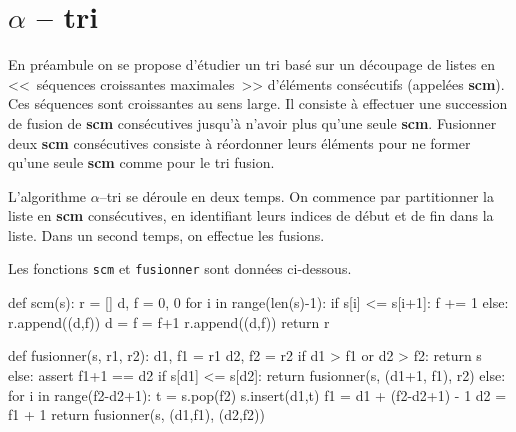 \documentclass[10pt,fleqn]{article} %
\begin{document}

\vspace{2cm}
\pagestyle{fancy}
\thispagestyle{plain}

\section*{$\alpha$ -- tri}
En préambule on se propose d'étudier un tri basé sur un découpage de listes en <<~séquences croissantes maximales~>> d'éléments consécutifs (appelées \textbf{scm}). Ces séquences sont croissantes au sens large.  Il consiste à effectuer une succession de fusion de \textbf{scm} consécutives jusqu'à n'avoir plus qu'une seule \textbf{scm}. Fusionner deux \textbf{scm} consécutives consiste à réordonner leurs éléments pour ne former qu'une seule \textbf{scm} comme pour le tri fusion. 

L'algorithme $\alpha$--tri se déroule en deux temps. On commence par partitionner la liste en \textbf{scm}
consécutives, en identifiant leurs indices de début et de fin dans la liste. Dans un second temps,
on effectue les fusions.

Les fonctions \texttt{scm} et \texttt{fusionner} sont données ci-dessous.


\begin{minipage}[c]{.45\linewidth}
\begin{py}
\begin{python}
def scm(s):
    r = []
    d, f = 0, 0
    for i in range(len(s)-1):
        if s[i] <= s[i+1]:
            f += 1
        else:
            r.append((d,f))
            d = f = f+1
    r.append((d,f))
    return r
\end{python}
\end{py}
\end{minipage} \hfill
\begin{minipage}[c]{.45\linewidth}
\begin{py}
\begin{python}
def fusionner(s, r1, r2):
    d1, f1 = r1
    d2, f2 = r2
    if d1 > f1 or d2 > f2:
        return s
    else:
        assert f1+1 == d2
        if s[d1] <= s[d2]:
            return fusionner(s, (d1+1, f1), r2)
        else:
            for i in range(f2-d2+1):
                t = s.pop(f2) 
                s.insert(d1,t) 
            f1 = d1 + (f2-d2+1) - 1
            d2 = f1 + 1
            return fusionner(s, (d1,f1), (d2,f2))
\end{python}
\end{py}

\end{minipage}
\end{document}
